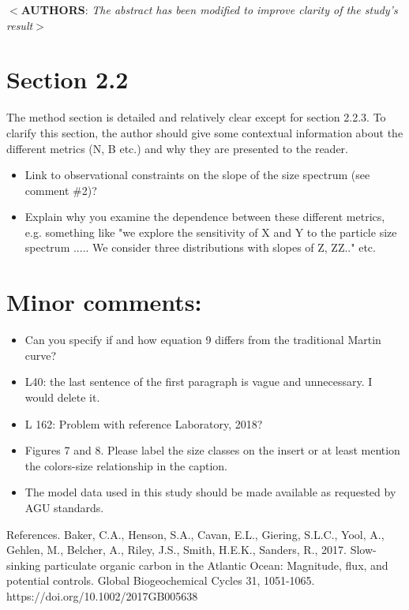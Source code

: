 \documentclass[12pt,letter]{article}
\newcommand{\rep}[1]{\color{blue}$<$\textbf{AUTHORS}: \textit{#1}$>$\color{black}\\}
\begin{document}
\rep{The abstract has been modified to improve clarity of the study's result}

\section*{Section 2.2}
The method section is detailed and relatively clear except for section 2.2.3. To clarify this section, the author should give some contextual information about the different metrics (N, B etc.) and why they are presented to the reader. 
\begin{itemize}
	\item Link to observational constraints on the slope of the size spectrum (see comment \#2)?
	
	\item Explain why you examine the dependence between these different metrics, e.g. something like "we explore the sensitivity of X and Y to the particle size spectrum ..... We consider three distributions with slopes of Z, ZZ.." etc.
\end{itemize}


\section*{Minor comments:}
\begin{itemize}	
	\item Can you specify if and how equation 9 differs from the traditional Martin curve?
	
	\item L40: the last sentence of the first paragraph is vague and unnecessary. I would delete it.
	\item L 162: Problem with reference Laboratory, 2018?
	
	\item Figures 7 and 8. Please label the size classes on the insert or at least mention the colors-size relationship in the caption.
	
	\item The model data used in this study should be made available as requested by AGU standards.
\end{itemize}

References. 
Baker, C.A., Henson, S.A., Cavan, E.L., Giering, S.L.C., Yool, A., Gehlen, M., Belcher, A., Riley, J.S., Smith, H.E.K., Sanders, R., 2017. Slow-sinking particulate organic carbon in the Atlantic Ocean: Magnitude, flux, and potential controls. Global Biogeochemical Cycles 31, 1051-1065. https://doi.org/10.1002/2017GB005638\\
\end{document}
